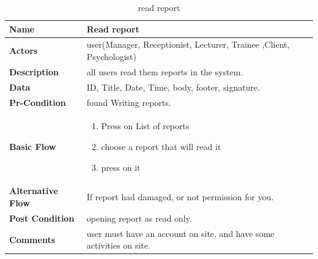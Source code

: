 \documentclass[../Psychological_system_web_application.tex]{subfiles}
\begin{document}
	\begin{center}
		\begin{table}[h!]
			\begin{tabular}{ | m{4cm} | m{10cm}| } 
				\hline
			 	\textbf{\large Name}& Read report\\ 
				\hline
			  	\textbf{\large Actors}& user(Manager, Receptionist, Lecturer, Trainee ,Client, Psychologist)\\ 
				\hline
			  	\textbf{\large Description}& all users read them reports in the system.\\ 
				\hline
				\textbf{\large Data}& ID, Title, Date, Time, body, footer, signature.\\ 
				\hline
				 \textbf{\large Pr-Condition}& found Writing reports. \\ 
				\hline
				\textbf{\large Basic Flow}&\begin{enumerate}
				\item
					Press on List of reports
				\item
					choose a report that will read it
				\item 
					press on it \end{enumerate}\\
					\hline
				\textbf{\large Alternative Flow}& If report had damaged, or not permission for you.\\ 
				\hline
				\textbf{\large Post Condition}& opening report as read only.\\ 
				\hline
				\textbf{\large Comments}& user must have an account on site, and have some activities on site.\\ 
				\hline
			\end{tabular}
			\caption{read report}
			\label{table:READ-REPORT}
		\end{table}
	\end{center}
	
\end{document}
